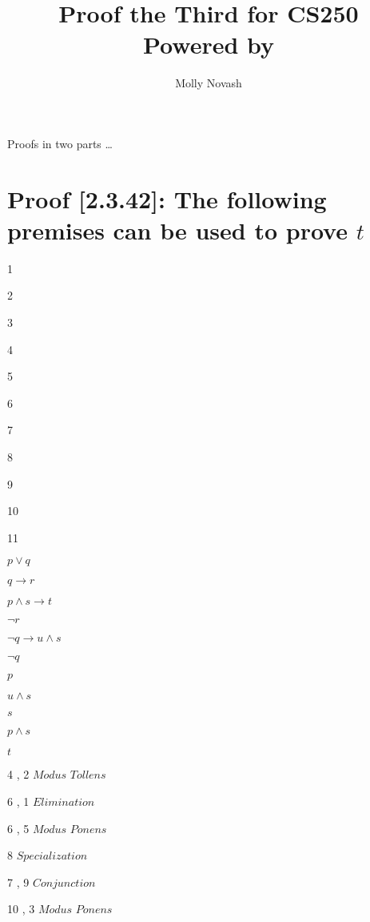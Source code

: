 \documentclass[12pt]{article}
\author{Molly Novash}
\title{%
\Huge Proof the Third for CS250  \\
\normalsize Powered by \LaTeXe}
\begin{document}
\sloppy
\maketitle
\bigskip

Proofs in two parts  \ldots

\section{Proof [2.3.42]: The following premises can be used to prove $t$} 
\bigskip

\begin{minipage}{0.2\textwidth}
1

2

3

4

5

6

7

8

9

10

11

\end{minipage}%
\begin{minipage}{.3\textwidth}
$p \lor q$

$q \longrightarrow r$

$p \land s \longrightarrow t$

$\lnot r$

$\lnot q \longrightarrow u \land s$

$\lnot q$

$p$

$u \land s$

$s$

$p \land s$

$t$

\end{minipage}%
\begin{minipage}{.35\textwidth}
\vspace{5\baselineskip}
4 , 2 \hspace{.3cm} $\textit{Modus Tollens}$

6 , 1 \hspace{.3cm} $\textit{Elimination}$

6 , 5 \hspace{.3cm} $\textit{Modus Ponens}$

8     \hspace{.9cm} $\textit{Specialization}$

7 , 9 \hspace{.3cm} $\textit{Conjunction}$

10 , 3 \hspace{.1cm} $\textit{Modus Ponens}$

\end{minipage}%
\end{document}
